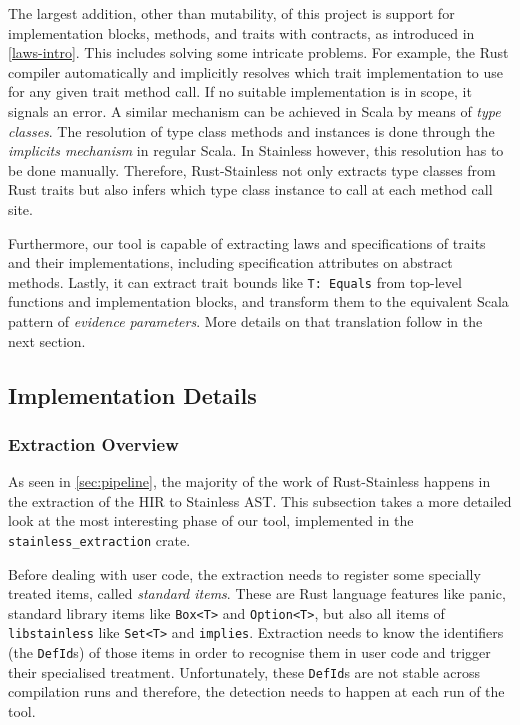 The largest addition, other than mutability, of this project is support for
implementation blocks, methods, and traits with contracts, as introduced in
\autoref{laws-intro}. This includes solving some intricate problems. For
example, the Rust compiler automatically and implicitly resolves which trait
implementation to use for any given trait method call. If no suitable
implementation is in scope, it signals an error.  A similar mechanism can be
achieved in Scala by means of \emph{type classes}. The resolution of type class
methods and instances is done through the \emph{implicits mechanism} in regular
Scala. In Stainless however, this resolution has to be done manually. Therefore,
Rust-Stainless not only extracts type classes from Rust traits but also infers
which type class instance to call at each method call site.

Furthermore, our tool is capable of extracting laws and specifications of traits
and their implementations, including specification attributes on abstract
methods. Lastly, it can extract  trait bounds like \passthrough{\lstinline!T:
Equals!} from top-level functions and implementation blocks, and transform them
to the equivalent Scala pattern of \emph{evidence parameters}. More details on
that translation follow in the next section.


\subsection{Implementation Details}

\subsubsection{Extraction Overview}
\label{sec:extraction-overview}

As seen in \autoref{sec:pipeline}, the majority of the work of Rust-Stainless
happens in the extraction of the HIR to Stainless AST. This subsection takes a
more detailed look at the most interesting phase of our tool, implemented in the
\lstinline!stainless_extraction! crate.

Before dealing with user code, the extraction needs to register some specially
treated items, called \emph{standard items}. These are Rust language features
like panic, standard library items like \lstinline!Box<T>! and
\lstinline!Option<T>!, but also all items of \lstinline!libstainless! like
\lstinline!Set<T>! and \lstinline!implies!. Extraction needs to know the
identifiers (the \lstinline!DefId!s) of those items in order to recognise them
in user code and trigger their specialised treatment. Unfortunately, these
\lstinline!DefId!s are not stable across compilation runs and therefore, the
detection needs to happen at each run of the tool.

